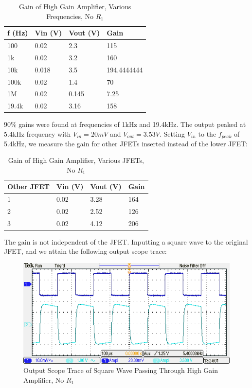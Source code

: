 \documentclass{article}
\begin{document}
    \begin{table}[H]
        \centering
        \caption{Gain of High Gain Amplifier, Various Frequencies, No $R_1$}
        \label{my-label}
        \begin{tabular}{llll}
        \textbf{f (Hz)} & \textbf{Vin (V)} & \textbf{Vout (V)} & \textbf{Gain} \\ \hline
        100 & 0.02 & 2.3 & 115 \\
        1k & 0.02 & 3.2 & 160 \\
        10k & 0.018 & 3.5 & 194.4444444 \\
        100k & 0.02 & 1.4 & 70 \\
        1M & 0.02 & 0.145 & 7.25 \\
        19.4k & 0.02 & 3.16 & 158
        \end{tabular}
    \end{table}
    90$\%$ gains were found at frequencies of 1kHz and 19.4kHz. The output peaked at 5.4kHz frequency with $V_{in} = 20mV$ and $V_{out} = 3.53V$. Setting $V_{in}$ to the $f_{peak}$ of 5.4kHz, we measure the gain for other JFETs inserted instead of the lower JFET:
    \begin{table}[H]
        \centering
        \caption{Gain of High Gain Amplifier, Various JFETs, No $R_1$}
        \label{my-label}
        \begin{tabular}{llll}
        \textbf{Other JFET} & \textbf{Vin (V)} & \textbf{Vout (V)} & \textbf{Gain} \\ \hline
        1 & 0.02 & 3.28 & 164 \\
        2 & 0.02 & 2.52 & 126 \\
        3 & 0.02 & 4.12 & 206
        \end{tabular}
    \end{table}
    The gain is not independent of the JFET. Inputting a square wave to the original JFET, and we attain the following output scope trace:\\
    \begin{figure}[H]
        \centering
        \includegraphics[scale = 0.7]{TEK00007.PNG}
        \caption{Output Scope Trace of Square Wave Passing Through High Gain Amplifier, No $R_1$}
        \label{fig:my_label}
    \end{figure}
\end{document}

